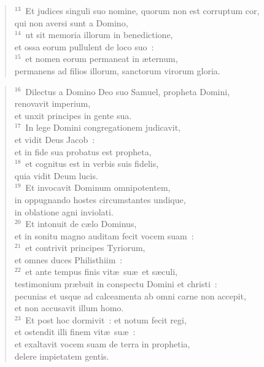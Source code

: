 \begin{flushleft}\begin{verse}${}^{13}$~Et judices singuli suo nomine, quorum non est corruptum cor,\\ qui non aversi sunt a Domino,\\
${}^{14}$~ut sit memoria illorum in benedictione,\\ et ossa eorum pullulent de loco suo~:\\
${}^{15}$~et nomen eorum permaneat in \ae ternum,\\ permanens ad filios illorum, sanctorum virorum gloria.\end{verse}\end{flushleft}


\begin{flushleft}\begin{verse}${}^{16}$~Dilectus a Domino Deo suo Samuel, propheta Domini,\\ renovavit imperium,\\ et unxit principes in gente sua.\\
${}^{17}$~In lege Domini congregationem judicavit,\\ et vidit Deus Jacob~:\\ et in fide sua probatus est propheta,\\
${}^{18}$~et cognitus est in verbis suis fidelis,\\ quia vidit Deum lucis.\\
${}^{19}$~Et invocavit Dominum omnipotentem,\\ in oppugnando hostes circumstantes undique,\\ in oblatione agni inviolati.\\
${}^{20}$~Et intonuit de c\ae lo Dominus,\\ et in sonitu magno auditam fecit vocem suam~:\\
${}^{21}$~et contrivit principes Tyriorum,\\ et omnes duces Philisthiim~:\\
${}^{22}$~et ante tempus finis vit\ae\ su\ae\ et s\ae culi,\\ testimonium pr\ae buit in conspectu Domini et christi~:\\ pecunias et usque ad calceamenta ab omni carne non accepit,\\ et non accusavit illum homo.\\
${}^{23}$~Et post hoc dormivit~: et notum fecit regi,\\ et ostendit illi finem vit\ae\ su\ae~:\\ et exaltavit vocem suam de terra in prophetia,\\ delere impietatem gentis.\end{verse}\end{flushleft}


